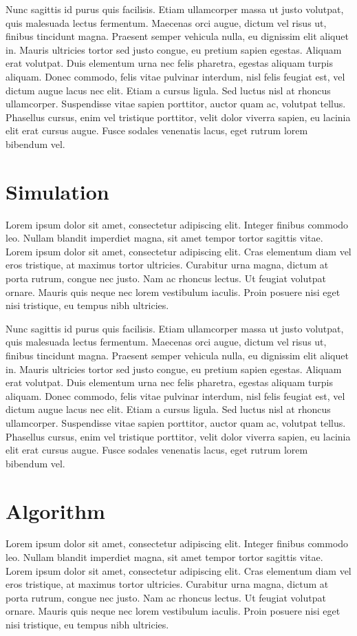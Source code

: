 \documentclass[
  digital,     %
  oneside,     %
  nosansbold,  %
  nocolorbold, %
  lof,         %
  lot,         %
]{fithesis4}
\begin{document}
Nunc sagittis id purus quis facilisis. Etiam ullamcorper massa ut justo volutpat, quis malesuada lectus fermentum. Maecenas orci augue, dictum vel risus ut, finibus tincidunt magna. Praesent semper vehicula nulla, eu dignissim elit aliquet in. Mauris ultricies tortor sed justo congue, eu pretium sapien egestas. Aliquam erat volutpat. Duis elementum urna nec felis pharetra, egestas aliquam turpis aliquam. Donec commodo, felis vitae pulvinar interdum, nisl felis feugiat est, vel dictum augue lacus nec elit. Etiam a cursus ligula. Sed luctus nisl at rhoncus ullamcorper. Suspendisse vitae sapien porttitor, auctor quam ac, volutpat tellus. Phasellus cursus, enim vel tristique porttitor, velit dolor viverra sapien, eu lacinia elit erat cursus augue. Fusce sodales venenatis lacus, eget rutrum lorem bibendum vel.

\section{Simulation}
Lorem ipsum dolor sit amet, consectetur adipiscing elit. Integer finibus commodo leo. Nullam blandit imperdiet magna, sit amet tempor tortor sagittis vitae. Lorem ipsum dolor sit amet, consectetur adipiscing elit. Cras elementum diam vel eros tristique, at maximus tortor ultricies. Curabitur urna magna, dictum at porta rutrum, congue nec justo. Nam ac rhoncus lectus. Ut feugiat volutpat ornare. Mauris quis neque nec lorem vestibulum iaculis. Proin posuere nisi eget nisi tristique, eu tempus nibh ultricies.

Nunc sagittis id purus quis facilisis. Etiam ullamcorper massa ut justo volutpat, quis malesuada lectus fermentum. Maecenas orci augue, dictum vel risus ut, finibus tincidunt magna. Praesent semper vehicula nulla, eu dignissim elit aliquet in. Mauris ultricies tortor sed justo congue, eu pretium sapien egestas. Aliquam erat volutpat. Duis elementum urna nec felis pharetra, egestas aliquam turpis aliquam. Donec commodo, felis vitae pulvinar interdum, nisl felis feugiat est, vel dictum augue lacus nec elit. Etiam a cursus ligula. Sed luctus nisl at rhoncus ullamcorper. Suspendisse vitae sapien porttitor, auctor quam ac, volutpat tellus. Phasellus cursus, enim vel tristique porttitor, velit dolor viverra sapien, eu lacinia elit erat cursus augue. Fusce sodales venenatis lacus, eget rutrum lorem bibendum vel.

\section{Algorithm}
Lorem ipsum dolor sit amet, consectetur adipiscing elit. Integer finibus commodo leo. Nullam blandit imperdiet magna, sit amet tempor tortor sagittis vitae. Lorem ipsum dolor sit amet, consectetur adipiscing elit. Cras elementum diam vel eros tristique, at maximus tortor ultricies. Curabitur urna magna, dictum at porta rutrum, congue nec justo. Nam ac rhoncus lectus. Ut feugiat volutpat ornare. Mauris quis neque nec lorem vestibulum iaculis. Proin posuere nisi eget nisi tristique, eu tempus nibh ultricies.
\end{document}
